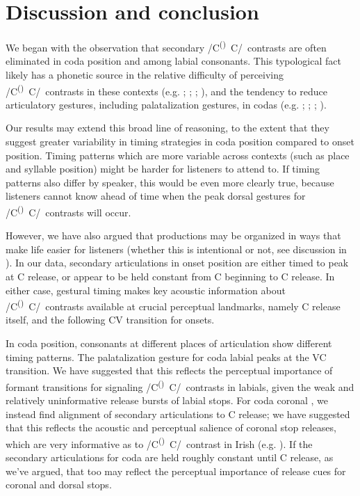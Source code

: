 \documentclass[output=paper,colorlinks,citecolor=brown]{langscibook}
\newcommand{\pal}{\ipa{ʲ}}
\newcommand{\vel}{\ipa{ˠ}}
\newcommand{\velop}{\textsuperscript{(}\vel\textsuperscript{)}}
\newcommand{\palcongen}{/C\velop\ C\pal/}
\begin{document}
\section{Discussion and conclusion}
We began with the observation that secondary \palcongen\ contrasts are often eliminated in coda position and among labial consonants. This typological fact likely has a phonetic source in the relative difficulty of perceiving \palcongen\ contrasts in these contexts (e.g. \cite{Kochetov2002_diss}; \citeyear{Kochetov2004_perception_place}; \cite{NiChiosain_Padgett2012_Irish_pal_acous_percep}; \cite{Padgett_NiChiosain2018_Russian_Irish_pal_percep}), and the tendency to reduce articulatory gestures, including palatalization gestures, in codas (e.g. \cite{Kochetov2002_diss}; \citeyear{Kochetov2006_syll_poss}; \citeyear{Kochetov2009_Russian_C_variation}; \cite{Bennett_etal2023_jphon_submission}).

Our results may extend this broad line of reasoning, to the extent that they suggest greater variability in timing strategies in coda position compared to onset position. Timing patterns which are more variable across contexts (such as place and syllable position) might be harder for listeners to attend to. If timing patterns also differ by speaker, this would be even more clearly true, because listeners cannot know ahead of time when the peak dorsal gestures for \palcongen\ contrasts will occur.

However, we have also argued that productions may be organized in ways that make life easier for listeners (whether this is intentional or not, see discussion in ). In our data, secondary articulations in onset position are either timed to peak at C release, or appear to be held constant from C beginning to C release. In either case, gestural timing makes key acoustic information about \palcongen\ contrasts available at crucial perceptual landmarks, namely C release itself, and the following CV transition for onsets.

In coda position, consonants at different places of articulation show different timing patterns. The palatalization gesture for coda labial \ipa{/P\pal/} peaks at the VC transition. We have suggested that this reflects the perceptual importance of formant transitions for signaling \palcongen\ contrasts in labials, given the weak and relatively uninformative release bursts of labial stops. For coda coronal \ipa{/T\pal/}, we instead find alignment of secondary articulations to C release; we have suggested that this reflects the acoustic and perceptual salience of coronal stop releases, which are very informative as to \palcongen\ contrast in Irish (e.g. \citealt{NiChiosain_Padgett2012_Irish_pal_acous_percep}). If the secondary articulations for coda \ipa{/T\vel\ K\pal\ K\vel/} are held roughly constant until C release, as we've argued, that too may reflect the perceptual importance of release cues for coronal and dorsal stops.
\end{document}
